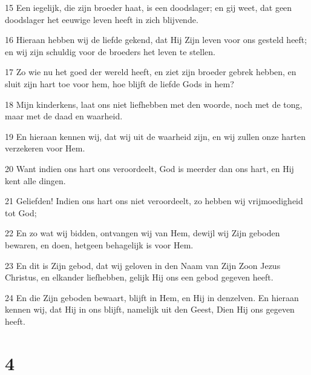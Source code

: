 \par 15 Een iegelijk, die zijn broeder haat, is een doodslager; en gij weet, dat geen doodslager het eeuwige leven heeft in zich blijvende.
\par 16 Hieraan hebben wij de liefde gekend, dat Hij Zijn leven voor ons gesteld heeft; en wij zijn schuldig voor de broeders het leven te stellen.
\par 17 Zo wie nu het goed der wereld heeft, en ziet zijn broeder gebrek hebben, en sluit zijn hart toe voor hem, hoe blijft de liefde Gods in hem?
\par 18 Mijn kinderkens, laat ons niet liefhebben met den woorde, noch met de tong, maar met de daad en waarheid.
\par 19 En hieraan kennen wij, dat wij uit de waarheid zijn, en wij zullen onze harten verzekeren voor Hem.
\par 20 Want indien ons hart ons veroordeelt, God is meerder dan ons hart, en Hij kent alle dingen.
\par 21 Geliefden! Indien ons hart ons niet veroordeelt, zo hebben wij vrijmoedigheid tot God;
\par 22 En zo wat wij bidden, ontvangen wij van Hem, dewijl wij Zijn geboden bewaren, en doen, hetgeen behagelijk is voor Hem.
\par 23 En dit is Zijn gebod, dat wij geloven in den Naam van Zijn Zoon Jezus Christus, en elkander liefhebben, gelijk Hij ons een gebod gegeven heeft.
\par 24 En die Zijn geboden bewaart, blijft in Hem, en Hij in denzelven. En hieraan kennen wij, dat Hij in ons blijft, namelijk uit den Geest, Dien Hij ons gegeven heeft.

\chapter{4}

